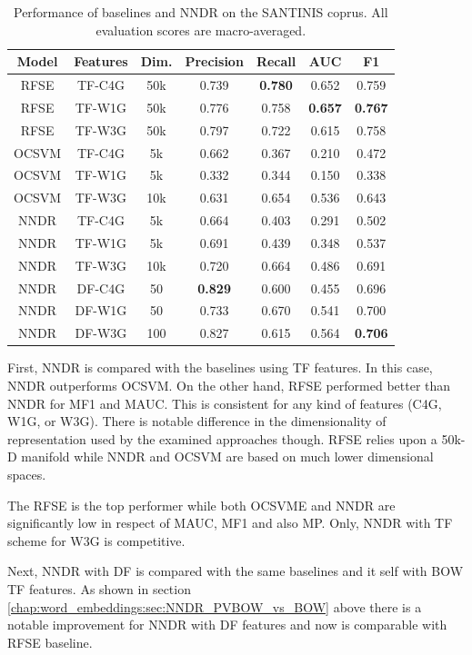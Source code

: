 \begin{table}[t]
\center
\caption {Performance of baselines and NNDR on the SANTINIS coprus. All evaluation scores are macro-averaged.}
\label{chap:word_embeddings:tbl:NNDR_RFSE_OCSVME_final}
\begin{tabular}{ccccccc}
\hline
Model & Features & Dim. & Precision & Recall & AUC & F1 \\
\hline
RFSE & TF-C4G & 50k & 0.739 & \textbf{0.780} & 0.652 & 0.759 \\
RFSE & TF-W1G & 50k & 0.776 & 0.758 & \textbf{0.657} & \textbf{0.767} \\
RFSE & TF-W3G & 50k & 0.797 & 0.722 & 0.615 & 0.758 \\
OCSVM & TF-C4G & 5k & 0.662 & 0.367 & 0.210 & 0.472\\
OCSVM & TF-W1G & 5k & 0.332 & 0.344 & 0.150 & 0.338\\
OCSVM & TF-W3G & 10k & 0.631 & 0.654 & 0.536 & 0.643\\
NNDR & TF-C4G & 5k & 0.664 & 0.403 & 0.291 & 0.502 \\
NNDR & TF-W1G & 5k & 0.691 & 0.439 & 0.348 & 0.537 \\
NNDR & TF-W3G & 10k & 0.720 & 0.664 & 0.486 & 0.691 \\
NNDR & DF-C4G & 50 & \textbf{0.829} & 0.600 & 0.455 & 0.696 \\
NNDR & DF-W1G & 50 & 0.733 & 0.670 & 0.541 & 0.700 \\
NNDR & DF-W3G & 100 & 0.827 & 0.615 & 0.564 & \textbf{0.706} \\
\hline
\end{tabular}
\end{table}

First, NNDR is compared with the baselines using TF features. In this case, NNDR outperforms OCSVM. On the other hand, RFSE performed better than NNDR for MF1 and MAUC. This is consistent for any kind of features (C4G, W1G, or W3G). There is notable difference in the dimensionality of representation used by the examined approaches though. RFSE relies upon a 50k-D manifold while NNDR and OCSVM are based on much lower dimensional spaces. 

The RFSE is the top performer while both OCSVME and NNDR are significantly low in respect of MAUC, MF1 and also MP.  Only, NNDR with TF scheme for W3G is competitive.

Next, NNDR with DF is compared with the same baselines and it self with BOW TF features. As shown in section \ref{chap:word_embeddings:sec:NNDR_PVBOW_vs_BOW} above there is a notable improvement for NNDR with DF features and now is comparable with RFSE baseline. 


